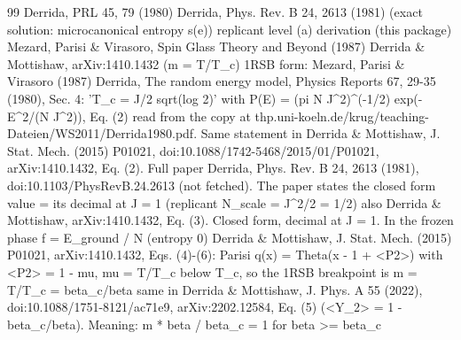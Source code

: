 \documentclass[11pt]{article}
\begin{document}
\begin{thebibliography}{99}
 Derrida, PRL 45, 79 (1980)
 Derrida, Phys. Rev. B 24, 2613 (1981) (exact solution: microcanonical entropy s(e))
 replicant level (a) derivation (this package)
 Mezard, Parisi \& Virasoro, Spin Glass Theory and Beyond (1987)
 Derrida \& Mottishaw, arXiv:1410.1432 (m = T/T\_c)
 1RSB form: Mezard, Parisi \& Virasoro (1987)
 Derrida, The random energy model, Physics Reports 67, 29-35 (1980), Sec. 4: 'T\_c = J/2 sqrt(log 2)' with P(E) = (pi N J\^{}2)\^{}(-1/2) exp(-E\^{}2/(N J\^{}2)), Eq. (2)
 read from the copy at thp.uni-koeln.de/krug/teaching-Dateien/WS2011/Derrida1980.pdf. Same statement in Derrida \& Mottishaw, J. Stat. Mech. (2015) P01021, doi:10.1088/1742-5468/2015/01/P01021, arXiv:1410.1432, Eq. (2). Full paper Derrida, Phys. Rev. B 24, 2613 (1981), doi:10.1103/PhysRevB.24.2613 (not fetched). The paper states the closed form
 value = its decimal at J = 1 (replicant N\_scale = J\^{}2/2 = 1/2)
 also Derrida \& Mottishaw, arXiv:1410.1432, Eq. (3). Closed form, decimal at J = 1. In the frozen phase f = E\_ground / N (entropy 0)
 Derrida \& Mottishaw, J. Stat. Mech. (2015) P01021, arXiv:1410.1432, Eqs. (4)-(6): Parisi q(x) = Theta(x - 1 + \textless{}P2\textgreater{}) with \textless{}P2\textgreater{} = 1 - mu, mu = T/T\_c below T\_c, so the 1RSB breakpoint is m = T/T\_c = beta\_c/beta
 same in Derrida \& Mottishaw, J. Phys. A 55 (2022), doi:10.1088/1751-8121/ac71e9, arXiv:2202.12584, Eq. (5) (\textless{}Y\_2\textgreater{} = 1 - beta\_c/beta). Meaning: m * beta / beta\_c = 1 for beta \textgreater{}= beta\_c
\end{thebibliography}
\end{document}
